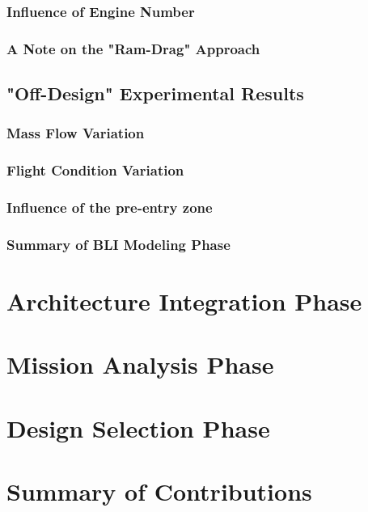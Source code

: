 \documentclass[12pt]{gatech-thesis}
\begin{document}
\subsection{Influence of Engine Number}

\subsection{A Note on the "Ram-Drag" Approach}

\section{"Off-Design" Experimental Results}

\subsection{Mass Flow Variation}

\subsection{Flight Condition Variation}

\subsection{Influence of the pre-entry zone}

\subsection{Summary of BLI Modeling Phase}

\chapter{Architecture Integration Phase}

\chapter{Mission Analysis Phase}

\chapter{Design Selection Phase}

\chapter{  Summary of Contributions}


\nocite{*}
 

\begin{postliminary}


\end{postliminary}
\end{document}
